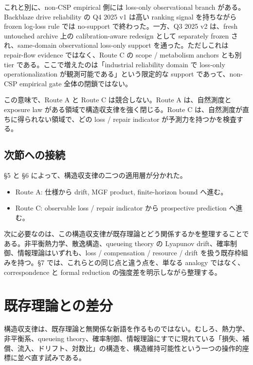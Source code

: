 \documentclass[12pt,a4paper]{article}
\begin{document}
これと別に、non-CSP empirical 側には loss-only observational branch がある。Backblaze drive reliability の Q4 2025 v1 は高い ranking signal を持ちながら frozen log-loss rule では no-support で終わった。一方、Q3 2025 v2 は、fresh untouched archive 上の calibration-aware redesign として separately frozen され、same-domain observational loss-only support を通った。ただしこれは repair-flow evidence ではなく、Route C の scope / metabolism anchors とも別 tier である。ここで増えたのは「industrial reliability domain で loss-only operationalization が観測可能である」という限定的な support であって、non-CSP empirical gate 全体の閉鎖ではない。

この意味で、Route A と Route C は競合しない。Route A は、自然測度と exposure law がある領域で構造収支律を強く閉じる。Route C は、自然測度が直ちに得られない領域で、どの loss / repair indicator が予測力を持つかを検査する。

\subsection{次節への接続}\label{ux6b21ux7bc0ux3078ux306eux63a5ux7d9a-2}

§5 と §6 によって、構造収支律の二つの適用層が分かれた。

\begin{itemize}
\tightlist
\item
  Route A: 仕様から drift, MGF product, finite-horizon bound へ進む。
\item
  Route C: observable loss / repair indicator から prospective prediction へ進む。
\end{itemize}

次に必要なのは、この構造収支律が既存理論とどう関係するかを整理することである。非平衡熱力学、散逸構造、queueing theory の Lyapunov drift、確率制御、情報理論はいずれも、loss / compensation / resource / drift を扱う既存枠組みを持つ。§7 では、これらとの同じ点と違う点を、単なる analogy ではなく、correspondence と formal reduction の強度差を明示しながら整理する。

\section{既存理論との差分}\label{ux65e2ux5b58ux7406ux8ad6ux3068ux306eux5deeux5206}

構造収支律は、既存理論と無関係な新語を作るものではない。むしろ、熱力学、非平衡系、queueing theory、確率制御、情報理論にすでに現れている「損失、補償、流入、ドリフト、対数比」の構造を、構造維持可能性という一つの操作的座標に並べ直す試みである。
\end{document}
